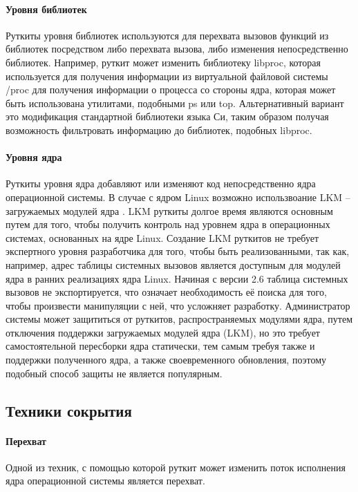 \documentclass{gost7.32-2001}
\begin{document}
\paragraph{Уровня библиотек}
Руткиты уровня библиотек используются для перехвата вызовов функций из
библиотек посредством либо перехвата вызова, либо изменения
непосредственно библиотек. Например, руткит может изменить библиотеку
libproc, которая используется для получения информации из виртуальной
файловой системы /proc для получения информации о процесса со стороны
ядра, которая может быть использована утилитами, подобными ps или top.
Альтернативный вариант это модификация стандартной библиотеки языка
Си, таким образом получая возможность фильтровать информацию до
библиотек, подобных libproc.
\paragraph{Уровня ядра}
Руткиты уровня ядра добавляют или изменяют код непосредственно ядра
операционной системы. В случае с ядром Linux возможно использвоание
LKM – загружаемых модулей ядра . LKM руткиты
долгое время являются основным путем для того, чтобы получить контроль
над уровнем ядра в операционных системах, основанных на ядре
Linux. Создание LKM руткитов не требует экспертного уровня
разработчика для того, чтобы быть реализованными, так как, например,
адрес таблицы системных вызовов является доступным для модулей ядра в
ранних реализациях ядра Linux. Начиная с версии 2.6 таблица системных
вызовов не экспортируется, что означает необходимость её поиска для
того, чтобы произвести манипуляции с ней, что усложняет
разработку. Администратор системы может защититься от руткитов,
распространяемых модулями ядра, путем отключения поддержки загружаемых
модулей ядра (LKM), но это требует самостоятельной пересборки ядра
статически, тем самым требуя также и поддержки полученного ядра, а
также своевременного обновления, поэтому подобный способ защиты не
является популярным.

\newpage
\subsection{Техники сокрытия}
\paragraph{Перехват}

Одной из техник, с помощью которой руткит может изменить поток
исполнения ядра операционной системы является перехват.
\end{document}

